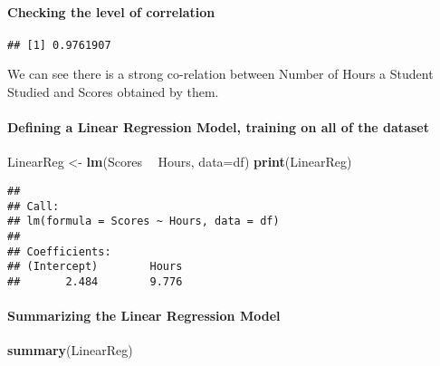 \documentclass[
]{article}
\newenvironment{Shaded}{\begin{snugshade}}{\end{snugshade}}
\newcommand{\DataTypeTok}[1]{\textcolor[rgb]{0.13,0.29,0.53}{#1}}
\newcommand{\KeywordTok}[1]{\textcolor[rgb]{0.13,0.29,0.53}{\textbf{#1}}}
\newcommand{\NormalTok}[1]{#1}
\newcommand{\OperatorTok}[1]{\textcolor[rgb]{0.81,0.36,0.00}{\textbf{#1}}}
\newcommand{\StringTok}[1]{\textcolor[rgb]{0.31,0.60,0.02}{#1}}
\begin{document}
\hypertarget{checking-the-level-of-correlation}{%
\paragraph{Checking the level of
correlation}\label{checking-the-level-of-correlation}}

\begin{Shaded}
\end{Shaded}

\begin{verbatim}
## [1] 0.9761907
\end{verbatim}

We can see there is a strong co-relation between Number of Hours a
Student Studied and Scores obtained by them.

\hypertarget{defining-a-linear-regression-model-training-on-all-of-the-dataset}{%
\paragraph{Defining a Linear Regression Model, training on all of the
dataset}\label{defining-a-linear-regression-model-training-on-all-of-the-dataset}}

\begin{Shaded}
\begin{Highlighting}[]
\NormalTok{LinearReg <-}\StringTok{ }\KeywordTok{lm}\NormalTok{(Scores }\OperatorTok{~}\StringTok{ }\NormalTok{Hours, }\DataTypeTok{data=}\NormalTok{df)  }
\KeywordTok{print}\NormalTok{(LinearReg)}
\end{Highlighting}
\end{Shaded}

\begin{verbatim}
## 
## Call:
## lm(formula = Scores ~ Hours, data = df)
## 
## Coefficients:
## (Intercept)        Hours  
##       2.484        9.776
\end{verbatim}

\hypertarget{summarizing-the-linear-regression-model}{%
\paragraph{Summarizing the Linear Regression
Model}\label{summarizing-the-linear-regression-model}}

\begin{Shaded}
\begin{Highlighting}[]
\KeywordTok{summary}\NormalTok{(LinearReg)}
\end{Highlighting}
\end{Shaded}
\end{document}
